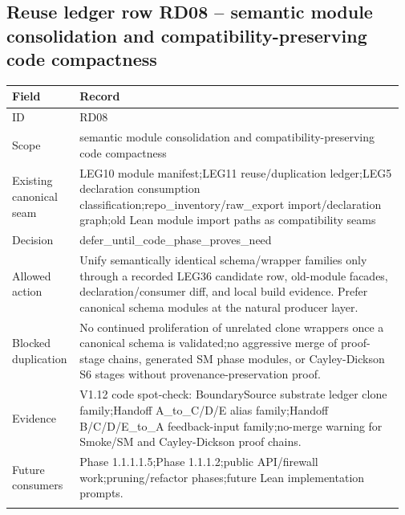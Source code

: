 \subsection*{Reuse ledger row RD08 -- semantic module consolidation and compatibility-preserving code compactness}
\begin{longtable}{L{0.16\linewidth} L{0.81\linewidth}}
\hline
\textbf{Field} & \textbf{Record}\\
\hline
ID & RD08\\
\hline\addlinespace[0.20em]
Scope & semantic module consolidation and compatibility-preserving code compactness\\
\hline\addlinespace[0.20em]
Existing canonical seam & LEG10 module manifest;\newline LEG11 reuse/\allowbreak{}duplication ledger;\newline LEG5 declaration consumption classification;\newline repo\_inventory/\allowbreak{}raw\_export import/\allowbreak{}declaration graph;\newline old Lean module import paths as compatibility seams\\
\hline\addlinespace[0.20em]
Decision & defer\_until\_code\_phase\_proves\_need\\
\hline\addlinespace[0.20em]
Allowed action & Unify semantically identical schema/\allowbreak{}wrapper families only through a recorded LEG36 candidate row, old-module facades, declaration/\allowbreak{}consumer diff, and local build evidence. Prefer canonical schema modules at the natural producer layer.\\
\hline\addlinespace[0.20em]
Blocked duplication & No continued proliferation of unrelated clone wrappers once a canonical schema is validated;\newline no aggressive merge of proof-stage chains, generated SM phase modules, or Cayley-Dickson S6 stages without provenance-preservation proof.\\
\hline\addlinespace[0.20em]
Evidence & V1.12 code spot-check: BoundarySource substrate ledger clone family;\newline Handoff A\_to\_C/\allowbreak{}D/\allowbreak{}E alias family;\newline Handoff B/\allowbreak{}C/\allowbreak{}D/\allowbreak{}E\_to\_A feedback-input family;\newline no-merge warning for Smoke/\allowbreak{}SM and Cayley-Dickson proof chains.\\
\hline\addlinespace[0.20em]
Future consumers & Phase 1.1.1.1.5;\newline Phase 1.1.1.2;\newline public API/\allowbreak{}firewall work;\newline pruning/\allowbreak{}refactor phases;\newline future Lean implementation prompts.\\
\hline\addlinespace[0.20em]
\end{longtable}
